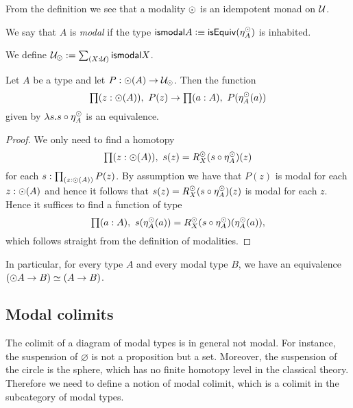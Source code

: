 From the definition we see that a modality $\odot$ is an idempotent monad on $\mathcal{U}$.

\begin{defn}
  We say that $A$ is \emph{modal} if the type $\mathsf{ismodal} A\vcentcolon\equiv \mathsf{isEquiv}(\eta^{\odot}_A)$ is inhabited.
\end{defn}

\begin{defn}
  We define $\modaltype:=\sm{X:\type}\ismodal X$. 
\end{defn}

\begin{thm}\label{prop:lv_n_deptype_sec_equiv_by_precomp}
Let $A$ be a type and let $P:\odot(A)\to\mathcal{U}_{\odot}$. Then the function
\begin{equation*}
\prd{z:\modal(A)}P(z)\to\prd{a:A}P(\mreturn^\modal_A(a))
\end{equation*}
given by $\lambda s.s\circ \eta^{\odot}_A$ is an equivalence.
\end{thm}

\begin{proof}
We only need to find a homotopy
\begin{equation*}
\prd{z:\modal(A)}s(z)= R^\modal_X(s\circ \mreturn^\modal_A)(z)
\end{equation*}
for each $s:\prd{z:\modal(A)}P(z)$. By assumption we have that $P(z)$ is
modal for each $z:\odot(A)$ and hence it follows that $s(z)= R^{\odot}_X(s\circ \eta^{\odot}_A)(z)$
is modal for each $z$. Hence it suffices to find a function of type
\begin{equation*}
\prd{a:A}s(\mreturn^\modal_A(a))= R^\modal_X(s\circ \mreturn^\modal_A)(\mreturn^\modal_A(a)),
\end{equation*}
which follows straight from the definition of modalities.
\end{proof}

In particular, for every type $A$ and every modal type $B$, we have an equivalence $(\odot A\to B)\simeq (A\to B)$.

\subsection*{Modal colimits}
The colimit of a diagram of modal types is in general not modal. For instance,
the suspension of $\varnothing$ is not a proposition but a set.
Moreover, the suspension of the circle is the sphere, which has no finite 
homotopy level in the classical theory. Therefore we need to define a notion of 
modal colimit, which is a colimit in the subcategory of modal types.

